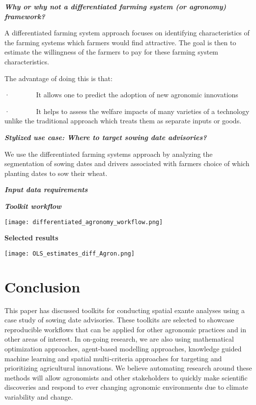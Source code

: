 \documentclass[
  letterpaper,
  DIV=11,
  numbers=noendperiod]{scrreprt}
\begin{document}
\textbf{\emph{Why or why not a differentiated farming system (or
agronomy) framework?}}

A differentiated farming system approach focuses on identifying
characteristics of the farming systems which farmers would find
attractive. The goal is then to estimate the willingness of the farmers
to pay for these farming system characteristics.

The advantage of doing this is that:

·~~~~~~~ It allows one to predict the adoption of new agronomic
innovations

·~~~~~~~ It helps to assess the welfare impacts of many varieties of a
technology unlike the traditional approach which treats them as separate
inputs or goods.

\textbf{\emph{Stylized use case: Where to target sowing date
advisories?}}

We use the differentiated farming systems approach by analyzing the
segmentation of sowing dates and drivers associated with farmers choice
of which planting dates to sow their wheat.

\textbf{\emph{Input data requirements}}

\textbf{\emph{Toolkit workflow}}

\texttt{[image: differentiated\_agronomy\_workflow.png]}

\textbf{Selected results}

\texttt{[image: OLS\_estimates\_diff\_Agron.png]}


\chapter{Conclusion}\label{conclusion}

This paper has discussed toolkits for conducting spatial exante analyses
using a case study of sowing date advisories. These toolkits are
selected to showcase reproducible workflows that can be applied for
other agronomic practices and in other areas of interest. In on-going
research, we are also using mathematical optimization approaches,
agent-based modelling approaches, knowledge guided machine learning and
spatial multi-criteria approaches for targeting and prioritizing
agricultural innovations. We believe automating research around these
methods will allow agronomists and other stakeholders to quickly make
scientific discoveries and respond to ever changing agronomic
environments due to climate variability and change.
\end{document}
